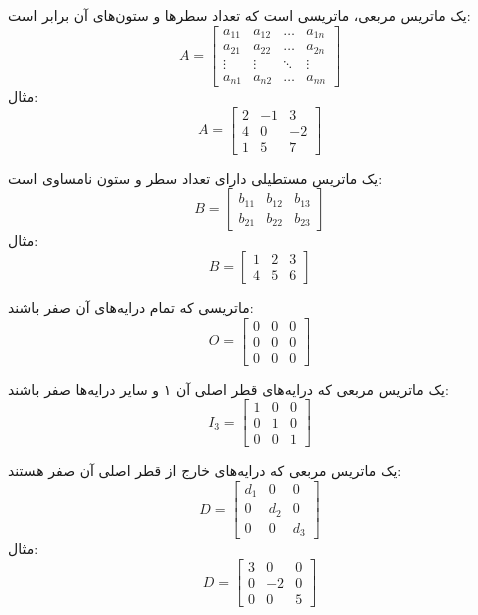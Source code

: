 \begin{definition}
	یک ماتریس مربعی، ماتریسی است که تعداد سطرها و ستون‌های آن برابر است:
	\[
	A =
	\begin{bmatrix}
		a_{11} & a_{12} & \dots & a_{1n} \\
		a_{21} & a_{22} & \dots & a_{2n} \\
		\vdots & \vdots & \ddots & \vdots \\
		a_{n1} & a_{n2} & \dots & a_{nn}
	\end{bmatrix}
	\]
	مثال:
	\[
	A =
	\begin{bmatrix}
		2 & -1 & 3 \\
		4 & 0 & -2 \\
		1 & 5 & 7
	\end{bmatrix}
	\]
\end{definition}
\begin{definition}
	یک ماتریس مستطیلی دارای تعداد سطر و ستون نامساوی است:
	\[
	B =
	\begin{bmatrix}
		b_{11} & b_{12} & b_{13} \\
		b_{21} & b_{22} & b_{23}
	\end{bmatrix}
	\]
	مثال:
	\[
	B =
	\begin{bmatrix}
		1 & 2 & 3 \\
		4 & 5 & 6
	\end{bmatrix}
	\]
\end{definition}
\begin{definition}
	ماتریسی که تمام درایه‌های آن صفر باشند:
	\[
	O =
	\begin{bmatrix}
		0 & 0 & 0 \\
		0 & 0 & 0 \\
		0 & 0 & 0
	\end{bmatrix}
	\]
\end{definition}
\begin{definition}
	یک ماتریس مربعی که درایه‌های قطر اصلی آن ۱ و سایر درایه‌ها صفر باشند:
	\[
	I_3=
	\begin{bmatrix}
		1 & 0 & 0 \\
		0 & 1 & 0 \\
		0 & 0 & 1
	\end{bmatrix}
	\]
\end{definition}
\begin{definition}
	یک ماتریس مربعی که درایه‌های خارج از قطر اصلی آن صفر هستند:
	\[
	D =
	\begin{bmatrix}
		d_1 & 0 & 0 \\
		0 & d_2 & 0 \\
		0 & 0 & d_3
	\end{bmatrix}
	\]
	مثال:
	\[
	D =
	\begin{bmatrix}
		3 & 0 & 0 \\
		0 & -2 & 0 \\
		0 & 0 & 5
	\end{bmatrix}
	\]
\end{definition}
